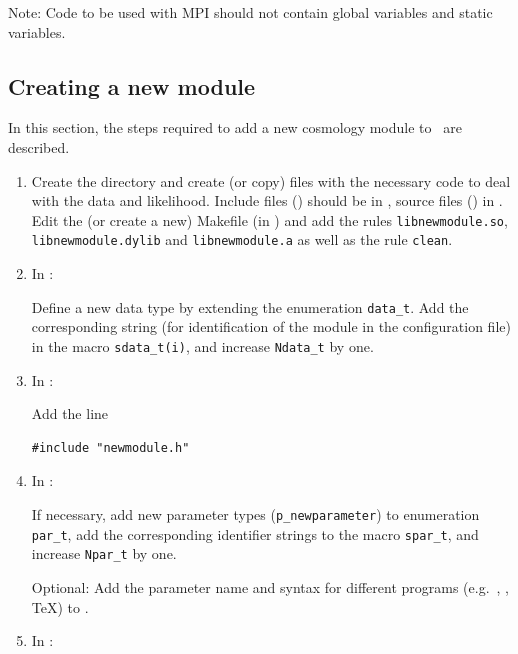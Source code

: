 \documentclass[11pt, chapterprefix, headsepline]{scrartcl}
\begin{document}
Note: Code to be used with MPI should not contain global variables and
static variables.

\subsection{Creating a new module}

In this section, the steps required to add a new cosmology module to
\CosmoPMC\ are described.

\begin{enumerate}

\item Create the directory  and create (or copy)
  files with the necessary
  code to deal with the data and likelihood. Include files
  () should be in , source files
  () in . Edit the (or create a
  new) Makefile (in ) and add the rules \texttt{libnewmodule.so},
    \texttt{libnewmodule.dylib} and \texttt{libnewmodule.a} as well as the
  rule \texttt{clean}.

\item In :

  Define a new data type by extending the enumeration
  \texttt{data\_t}. Add the corresponding string (for identification
  of the module in the configuration file) in the macro
  \texttt{sdata\_t(i)}, and increase \texttt{Ndata\_t} by one.

\item In :

  Add the line
\begin{verbatim}
#include "newmodule.h"
\end{verbatim}

\item In :

  If necessary, add new parameter types (\texttt{p\_newparameter}) to
  enumeration \texttt{par\_t}, add the corresponding identifier
  strings to the macro \texttt{spar\_t}, and increase \texttt{Npar\_t}
  by one.

  Optional: Add the parameter name and syntax for different programs
  (e.g.~, , \TeX) to .

\item In :


\end{enumerate}
\end{document}
